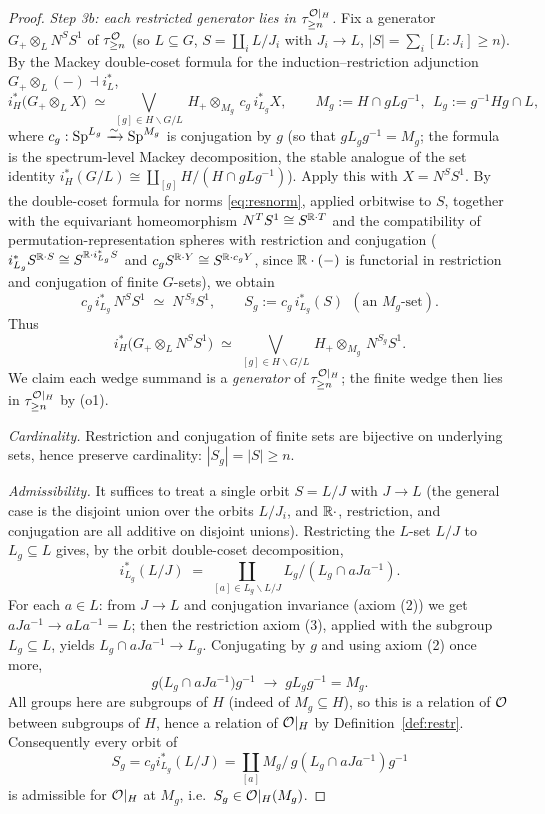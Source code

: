 \begin{proof}
\emph{Step 3b: each restricted generator lies in $\tau^{\mathcal{O}|_H}_{\ge n}$.} Fix a
generator $G_+\otimes_L N^S S^1$ of $\tau^{\mathcal{O}}_{\ge n}$ (so $L\subseteq G$,
$S=\coprod_i L/J_i$ with $J_i\to L$, $|S|=\sum_i[L:J_i]\ge n$). By the Mackey
double-coset formula for the induction--restriction adjunction
$G_+\otimes_L(-)\dashv i_L^\ast$,
\[
i_H^\ast\bigl(G_+\otimes_L X\bigr)\;\simeq\;
\bigvee_{[g]\in H\backslash G/L}\,
   H_+\otimes_{M_g}\, c_g\, i_{L_g}^\ast X ,
\qquad
M_g:=H\cap gLg^{-1},\ \ L_g:=g^{-1}Hg\cap L ,
\]
where $c_g:\mathrm{Sp}^{L_g}\xrightarrow{\sim}\mathrm{Sp}^{M_g}$ is conjugation by $g$
(so that $gL_gg^{-1}=M_g$; the formula is the spectrum-level Mackey decomposition,
the stable analogue of the set identity
$i_H^\ast(G/L)\cong\coprod_{[g]}H/(H\cap gLg^{-1})$). Apply this with $X=N^S S^1$.
By the double-coset formula for norms \eqref{eq:resnorm}, applied orbitwise to
$S$, together with the equivariant homeomorphism $N^TS^1\cong S^{\mathbb{R}\cdot T}$
and the compatibility of permutation-representation spheres with restriction and
conjugation ($i_{L_g}^\ast S^{\mathbb{R}\cdot S}\cong S^{\mathbb{R}\cdot i_{L_g}^\ast S}$ and
$c_g S^{\mathbb{R}\cdot Y}\cong S^{\mathbb{R}\cdot c_g Y}$, since $\mathbb{R}\cdot(-)$ is functorial
in restriction and conjugation of finite $G$-sets), we obtain
\[
c_g\, i_{L_g}^\ast\,N^S S^1\;\simeq\; N^{\,S_g} S^1,\qquad
S_g:=c_g\, i_{L_g}^\ast(S)\ \ (\text{an }M_g\text{-set}).
\]
Thus
\[
i_H^\ast\bigl(G_+\otimes_L N^S S^1\bigr)\;\simeq\;
\bigvee_{[g]\in H\backslash G/L}\, H_+\otimes_{M_g}\,N^{S_g}S^1 .
\]
We claim each wedge summand is a \emph{generator} of $\tau^{\mathcal{O}|_H}_{\ge n}$;
the finite wedge then lies in $\tau^{\mathcal{O}|_H}_{\ge n}$ by (o1).

\emph{Cardinality.} Restriction and conjugation of finite sets are bijective on
underlying sets, hence preserve cardinality: $|S_g|=|S|\ge n$.

\emph{Admissibility.} It suffices to treat a single orbit $S=L/J$ with $J\to L$
(the general case is the disjoint union over the orbits $L/J_i$, and $\mathbb{R}\cdot$,
restriction, and conjugation are all additive on disjoint unions). Restricting
the $L$-set $L/J$ to $L_g\subseteq L$ gives, by the orbit double-coset
decomposition,
\[
i_{L_g}^\ast(L/J)\;=\;\coprod_{[a]\in L_g\backslash L/J} L_g/(L_g\cap aJa^{-1}) .
\]
For each $a\in L$: from $J\to L$ and conjugation invariance (axiom (2)) we get
$aJa^{-1}\to aLa^{-1}=L$; then the restriction axiom (3), applied with the
subgroup $L_g\subseteq L$, yields $L_g\cap aJa^{-1}\to L_g$. Conjugating by $g$ and
using axiom (2) once more,
\[
g\bigl(L_g\cap aJa^{-1}\bigr)g^{-1}\;\to\; gL_gg^{-1}=M_g .
\]
All groups here are subgroups of $H$ (indeed of $M_g\subseteq H$), so this is a
relation of $\mathcal{O}$ between subgroups of $H$, hence a relation of $\mathcal{O}|_H$ by
Definition~\ref{def:restr}. Consequently every orbit of
\[
S_g=c_g i_{L_g}^\ast(L/J)=\coprod_{[a]} M_g\big/\,g(L_g\cap aJa^{-1})g^{-1}
\]
is admissible for $\mathcal{O}|_H$ at $M_g$, i.e.\ $S_g\in\mathcal{O}|_H(M_g)$.


\end{proof}
